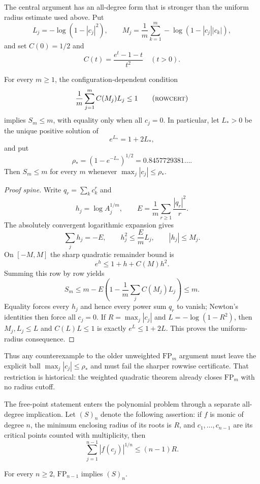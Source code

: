 The central argument has an all-degree form that is stronger than the uniform
radius estimate used above.  Put
\[
 L_j=-\log(1-|c_j|^2),\qquad
 M_j=\frac1m\sum_{k=1}^m-\log(1-|c_j||c_k|),
\]
and set $C(0)=1/2$ and
\[
 C(t)=\frac{e^t-1-t}{t^2}\quad(t>0).
\]

\begin{theorem}
\label{res:fp-central-radius}
For every $m\ge1$, the configuration-dependent condition
\[
 \frac1m\sum_{j=1}^m C(M_j)L_j\le1
 \tag{\textsc{rowcert}}
\]
implies $S_m\le m$, with equality only when all $c_j=0$.  In particular,
let $L_*>0$ be the unique positive solution of
\[
 e^{L_*}=1+2L_*,
\]
and put
\[
 \rho_*=(1-e^{-L_*})^{1/2}=0.8457729381\ldots .
\]
Then $S_m\le m$ for every $m$ whenever
$\max_j|c_j|\le\rho_*$.
\end{theorem}

\begin{proof}[Proof spine]
Write $q_r=\sum_kc_k^r$ and
\[
 h_j=\log A_j^{1/m},\qquad
 E=\frac1m\sum_{r\ge1}\frac{|q_r|^2}{r}.
\]
The absolutely convergent logarithmic expansion gives
\[
 \sum_jh_j=-E,\qquad
 h_j^2\le\frac EmL_j,\qquad |h_j|\le M_j.
\]
On $[-M,M]$ the sharp quadratic remainder bound is
\[
 e^h\le1+h+C(M)h^2.
\]
Summing this row by row yields
\[
 S_m\le m-E\left(1-\frac1m\sum_jC(M_j)L_j\right)\le m.
\]
Equality forces every $h_j$ and hence every power sum $q_r$ to vanish;
Newton's identities then force all $c_j=0$.  If
$R=\max_j|c_j|$ and $L=-\log(1-R^2)$, then
$M_j,L_j\le L$ and $C(L)L\le1$ is exactly
$e^L\le1+2L$.  This proves the uniform-radius consequence.
\end{proof}

Thus any counterexample to the older unweighted $\mathrm{FP}_m$ argument
must leave the explicit ball $\max_j|c_j|\le\rho_*$ and must fail the
sharper rowwise certificate.  That restriction is historical: the weighted
quadratic theorem already closes $\mathrm{FP}_m$ with no radius cutoff.

The free-point statement enters the polynomial problem through a separate
all-degree implication.  Let $(S)_n$ denote the following assertion: if $f$ is
monic of degree $n$, the minimum enclosing radius of its roots is $R$, and
$c_1,\ldots,c_{n-1}$ are its critical points counted with multiplicity, then
\[
  \sum_{j=1}^{n-1}|f(c_j)|^{1/n}\le(n-1)R.
\]

\begin{theorem}\label{res:fp-to-s}
For every $n\ge2$, $\mathrm{FP}_{n-1}$ implies $(S)_n$.
\end{theorem}

